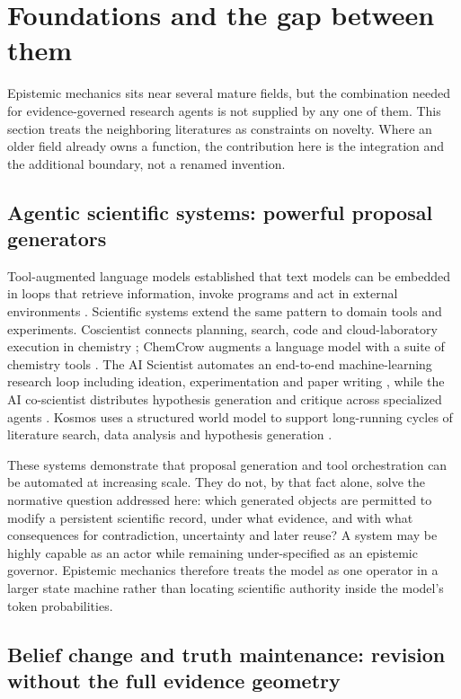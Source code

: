 \documentclass[11pt]{article}
\begin{document}
\section{Foundations and the gap between them}

Epistemic mechanics sits near several mature fields, but the combination needed for evidence-governed research agents is not supplied by any one of them. This section treats the neighboring literatures as constraints on novelty. Where an older field already owns a function, the contribution here is the integration and the additional boundary, not a renamed invention.

\subsection{Agentic scientific systems: powerful proposal generators}

Tool-augmented language models established that text models can be embedded in loops that retrieve information, invoke programs and act in external environments \cite{lewis2020,yao2023,schick2023,mialon2023}. Scientific systems extend the same pattern to domain tools and experiments. Coscientist connects planning, search, code and cloud-laboratory execution in chemistry \cite{boiko2023}; ChemCrow augments a language model with a suite of chemistry tools \cite{bran2024}. The AI Scientist automates an end-to-end machine-learning research loop including ideation, experimentation and paper writing \cite{lu2024}, while the AI co-scientist distributes hypothesis generation and critique across specialized agents \cite{gottweis2025}. Kosmos uses a structured world model to support long-running cycles of literature search, data analysis and hypothesis generation \cite{kosmos2025}.

These systems demonstrate that proposal generation and tool orchestration can be automated at increasing scale. They do not, by that fact alone, solve the normative question addressed here: which generated objects are permitted to modify a persistent scientific record, under what evidence, and with what consequences for contradiction, uncertainty and later reuse? A system may be highly capable as an actor while remaining under-specified as an epistemic governor. Epistemic mechanics therefore treats the model as one operator in a larger state machine rather than locating scientific authority inside the model's token probabilities.

\subsection{Belief change and truth maintenance: revision without the full evidence geometry}
\end{document}
